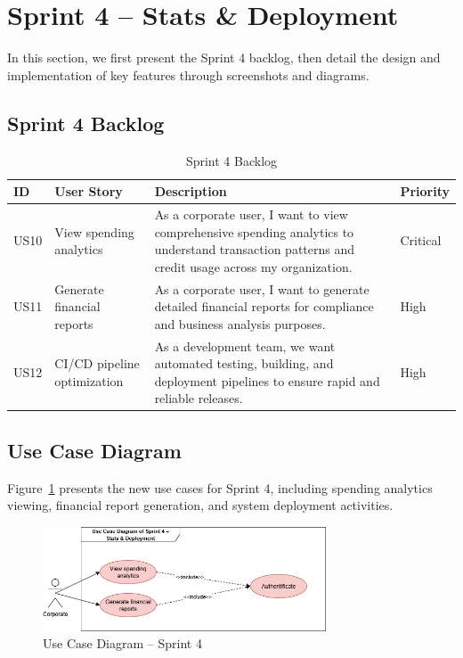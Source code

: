 \section{Sprint 4 – Stats \& Deployment}

In this section, we first present the Sprint 4 backlog, then detail the design and implementation of key features through screenshots and diagrams.

\subsection{Sprint 4 Backlog}
 
\begin{table}[!htbp]
  \centering
  \small
  \caption{Sprint 4 Backlog}
  \label{tab:backlog_sprint4}
  \begin{tabular}{|p{1cm}|p{5cm}|p{6cm}|p{2cm}|}
    \hline
    \textbf{ID} & \textbf{User Story} & \textbf{Description} & \textbf{Priority} \\ \hline
    US10 & View spending analytics & As a corporate user, I want to view comprehensive spending analytics to understand transaction patterns and credit usage across my organization. & Critical \\ \hline
    US11 & Generate financial reports & As a corporate user, I want to generate detailed financial reports for compliance and business analysis purposes. & High \\ \hline
    US12 & CI/CD pipeline optimization & As a development team, we want automated testing, building, and deployment pipelines to ensure rapid and reliable releases. & High \\ \hline
  \end{tabular}
\end{table}

\subsection{Use Case Diagram}

Figure~\ref{fig:uc_sprint4} presents the new use cases for Sprint 4, including spending analytics viewing, financial report generation, and system deployment activities.

\begin{figure}[H]
  \centering
  \includegraphics[width=0.75\textwidth]{images/usecase_sprint4.png}
  \caption{Use Case Diagram – Sprint 4}
  \label{fig:uc_sprint4}
\end{figure}

